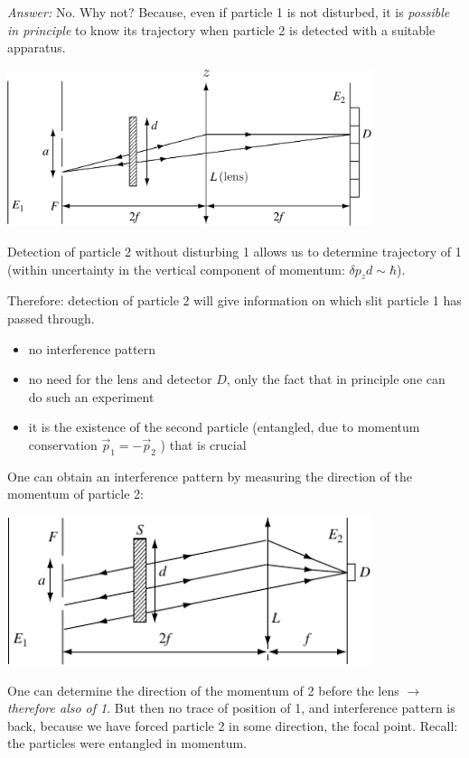 \documentclass[12pt]{article}
\begin{document}
\emph{Answer:} No. Why not? Because, even if particle 1
is not disturbed, it is \emph{possible in principle}
to know its trajectory when particle 2 is
detected with a suitable apparatus.
\begin{center}
\includegraphics[width=0.8\textwidth]{Figures/InterferenceEntangled1.pdf}
\end{center}

Detection of particle 2
without disturbing 1
allows us to determine
trajectory of 1 (within
uncertainty in the vertical
component of momentum: $\delta p_z d \sim \hbar$).

Therefore: detection of particle 2 will give information
on which slit particle 1 has passed through.
\begin{itemize}
\item no interference pattern
\item no need for the lens and detector \(D\), only
the fact that in principle one can do
such an experiment
\item it is the existence of the second particle (entangled,
due to momentum conservation \(\vec{p}_{1}=-\vec{p}_{2}\) ) that
is crucial
\end{itemize}
One can obtain an interference pattern by measuring
the direction of the momentum of particle 2:
\begin{center}
\includegraphics[width=0.8\textwidth]{Figures/InterferenceEntangled2.pdf}
\end{center}

One can determine the
direction of the momentum
of 2 before the lens $\to$
\emph{therefore also of 1}.
But then no trace of position of 1, and
interference pattern is back, because we
have forced particle 2 in some direction,
the focal point. Recall: the particles
were entangled in momentum.
\end{document}
